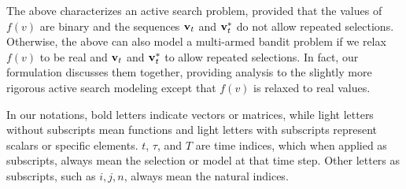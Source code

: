 The above characterizes an active search problem, provided that the values of $f(v)$ are binary and the sequences $\mathbf{v}_t$ and $\mathbf{v}_t^*$ do not allow repeated selections. 
Otherwise, 
the above can also model a multi-armed bandit problem
if we relax $f(v)$ to be real and $\mathbf{v}_t$ and $\mathbf{v}_t^*$ to allow repeated selections. 
In fact, our formulation discusses them together, providing analysis to the slightly more rigorous active search modeling except that $f(v)$ is relaxed to real values.



In our notations, bold letters indicate vectors or matrices, while light letters without subscripts mean functions and light letters with subscripts represent scalars or specific elements. $t$, $\tau$, and $T$ are time indices, which when applied as subscripts, always mean the selection or model at that time step. Other letters as subscripts, such as $i,j,n$, always mean the natural indices. %


